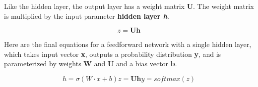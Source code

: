 \documentclass{article}
\begin{document}
Like the hidden layer, the output layer has a weight matrix \textbf{U}. The weight matrix is multiplied by the input parameter \textbf{hidden layer \textit{h}}.

\[
    z = \textbf{Uh}
\]

Here are the final equations for a feedforward network with a single hidden layer, which
takes input vector \textbf{x}, outputs a probability distribution \textbf{y}, and is parameterized by weights \textbf{W}
and \textbf{U} and a bias vector \textbf{b}.

\[
    h = \sigma (W\cdot x + b)
    z = \textbf{Uh}
    y = softmax (z)
\]
\end{document}
